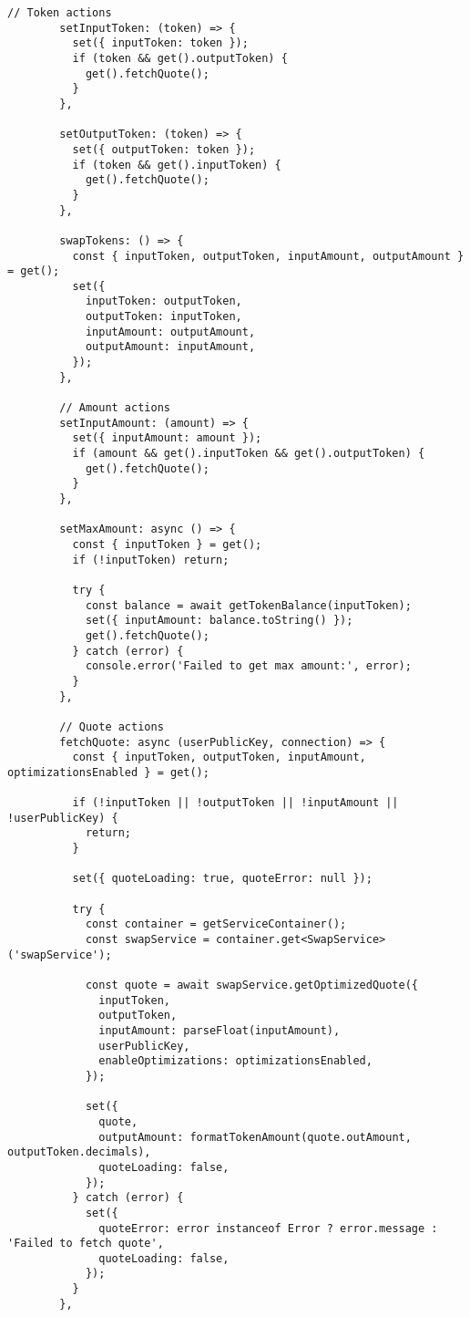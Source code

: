 \documentclass[11pt,a4paper]{article}
\begin{document}
\begin{lstlisting}[style=typescript, caption=Zustand Store Implementation]
        // Token actions
        setInputToken: (token) => {
          set({ inputToken: token });
          if (token && get().outputToken) {
            get().fetchQuote();
          }
        },
        
        setOutputToken: (token) => {
          set({ outputToken: token });
          if (token && get().inputToken) {
            get().fetchQuote();
          }
        },
        
        swapTokens: () => {
          const { inputToken, outputToken, inputAmount, outputAmount } = get();
          set({
            inputToken: outputToken,
            outputToken: inputToken,
            inputAmount: outputAmount,
            outputAmount: inputAmount,
          });
        },
        
        // Amount actions
        setInputAmount: (amount) => {
          set({ inputAmount: amount });
          if (amount && get().inputToken && get().outputToken) {
            get().fetchQuote();
          }
        },
        
        setMaxAmount: async () => {
          const { inputToken } = get();
          if (!inputToken) return;
          
          try {
            const balance = await getTokenBalance(inputToken);
            set({ inputAmount: balance.toString() });
            get().fetchQuote();
          } catch (error) {
            console.error('Failed to get max amount:', error);
          }
        },
        
        // Quote actions
        fetchQuote: async (userPublicKey, connection) => {
          const { inputToken, outputToken, inputAmount, optimizationsEnabled } = get();
          
          if (!inputToken || !outputToken || !inputAmount || !userPublicKey) {
            return;
          }
          
          set({ quoteLoading: true, quoteError: null });
          
          try {
            const container = getServiceContainer();
            const swapService = container.get<SwapService>('swapService');
            
            const quote = await swapService.getOptimizedQuote({
              inputToken,
              outputToken,
              inputAmount: parseFloat(inputAmount),
              userPublicKey,
              enableOptimizations: optimizationsEnabled,
            });
            
            set({
              quote,
              outputAmount: formatTokenAmount(quote.outAmount, outputToken.decimals),
              quoteLoading: false,
            });
          } catch (error) {
            set({
              quoteError: error instanceof Error ? error.message : 'Failed to fetch quote',
              quoteLoading: false,
            });
          }
        },
        

\end{lstlisting}
\end{document}

